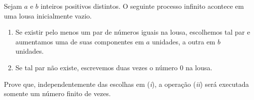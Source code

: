Sejam $a$ e $b$ inteiros positivos distintos. O seguinte processo infinito acontece em uma lousa inicialmente vazio.

\begin{enumerate}[label = (\textit{\roman*})]
	\item Se existir pelo menos um par de números iguais na lousa, escolhemos tal par e aumentamos uma de suas componentes em $a$ unidades, a outra em $b$ unidades.

	\item Se tal par não existe, escrevemos duas vezes o número $0$ na lousa.
\end{enumerate}

Prove que, independentemente das escolhas em (\textit{i}), a operação (\textit{ii}) será executada somente um número finito de vezes.
